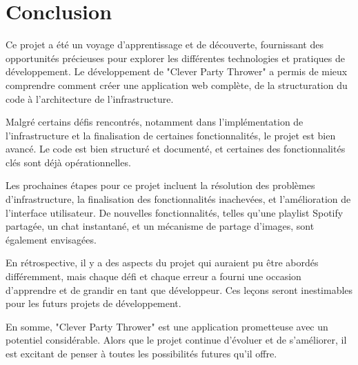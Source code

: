 \documentclass[12pt, a4paper, oneside]{article}
\begin{document}
    \section{Conclusion}\label{sec:conclusion}

    Ce projet a été un voyage d'apprentissage et de découverte,
    fournissant des opportunités précieuses pour explorer les différentes technologies et pratiques de développement.
    Le développement de "Clever Party Thrower" a permis de mieux comprendre comment créer une application web complète,
    de la structuration du code à l'architecture de l'infrastructure.

    Malgré certains défis rencontrés, notamment dans l'implémentation de l'infrastructure et la finalisation de certaines fonctionnalités,
    le projet est bien avancé.
    Le code est bien structuré et documenté, et certaines des fonctionnalités clés sont déjà opérationnelles.

    Les prochaines étapes pour ce projet incluent la résolution des problèmes d'infrastructure,
    la finalisation des fonctionnalités inachevées, et l'amélioration de l'interface utilisateur.
    De nouvelles fonctionnalités, telles qu'une playlist Spotify partagée, un chat instantané,
    et un mécanisme de partage d'images, sont également envisagées.

    En rétrospective, il y a des aspects du projet qui auraient pu être abordés différemment,
    mais chaque défi et chaque erreur a fourni une occasion d'apprendre et de grandir en tant que développeur.
    Ces leçons seront inestimables pour les futurs projets de développement.

    En somme, "Clever Party Thrower" est une application prometteuse avec un potentiel considérable.
    Alors que le projet continue d'évoluer et de s'améliorer, il est excitant de penser à toutes les possibilités futures qu'il offre.





    \newpage
    \printbibliography
\end{document}
